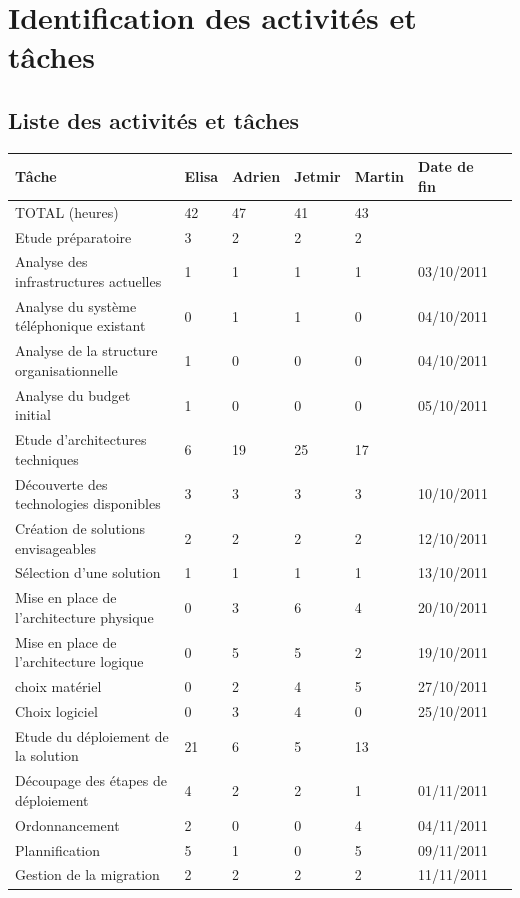 \section{Identification des activités et tâches}
\subsection{Liste des activités et tâches}


\begin{tabular}{|l|l|l|l|l|l|c|}
\hline	
\rowcolor{EnTete} \textbf{Tâche} & \textbf{Elisa} & \textbf{Adrien} & \textbf{Jetmir} & \textbf{Martin} & \textbf{Date de fin} \\ \hline
\rowcolor{Total} TOTAL (heures) & 42 & 47 & 41 & 43 & \\ \hline
\rowcolor{Activite} Etude préparatoire & 3 & 2 & 2 & 2 & \\ \hline
Analyse des infrastructures actuelles & 1 & 1 & 1 & 1 & 03/10/2011 \\ \hline
Analyse du système téléphonique existant & 0 & 1 & 1 & 0 & 04/10/2011 \\ \hline
Analyse de la structure organisationnelle & 1 & 0 & 0 & 0 & 04/10/2011  \\ \hline
Analyse du budget initial & 1 & 0 & 0 & 0 & 05/10/2011 \\ \hline
\rowcolor{Activite} Etude d'architectures techniques & 6 & 19 & 25 & 17 & \\ \hline
Découverte des technologies disponibles & 3 & 3 & 3 & 3 & 10/10/2011  \\ \hline
Création de solutions envisageables & 2 & 2 & 2 & 2 & 12/10/2011  \\ \hline
Sélection d'une solution & 1 & 1 & 1 & 1  & 13/10/2011 \\ \hline
Mise en place de l'architecture physique & 0 & 3 & 6 & 4 & 20/10/2011  \\ \hline
Mise en place de l'architecture logique & 0 & 5 & 5 & 2 & 19/10/2011  \\ \hline
choix matériel & 0 & 2 & 4 & 5 & 27/10/2011 \\ \hline
Choix logiciel & 0 & 3 & 4 & 0 & 25/10/2011  \\ \hline

\rowcolor{Activite} Etude du déploiement de la solution & 21 & 6 & 5 & 13 & \\ \hline
Découpage des étapes de déploiement & 4 & 2 & 2 & 1 & 01/11/2011 \\ \hline
Ordonnancement & 2 & 0 & 0 & 4 & 04/11/2011 \\ \hline
Plannification & 5 & 1 & 0 & 5 & 09/11/2011 \\ \hline
Gestion de la migration & 2 & 2 & 2 & 2 & 11/11/2011 \\ \hline


\end{tabular}
